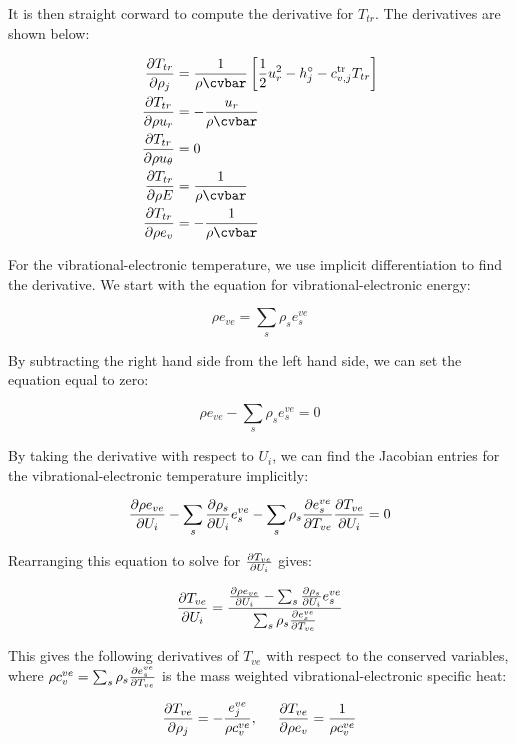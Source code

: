 \documentclass[10pt]{article}
\begin{document}
\begin{flushleft}
It is then straight corward to compute the derivative for $T_{tr}$. The derivatives are shown below:

\begin{align*}
    \pd{T_{tr}}{\rho_j} &= \frac{1}{\rho \cvbar} \bb{\frac{1}{2} u_r^2 - h_j^\circ - c_{v,j}^\text{tr} T_{tr}} \\
    \pd{T_{tr}}{\rho u_r} &= -\frac{u_r}{\rho \cvbar} \\
    \pd{T_{tr}}{\rho u_\theta} &= 0 \\
    \pd{T_{tr}}{\rho E} &= \frac{1}{\rho \cvbar} \\
    \pd{T_{tr}}{\rho e_v} &= -\frac{1}{\rho \cvbar}
\end{align*}

For the vibrational-electronic temperature, we use implicit differentiation to find the derivative. We start with the equation for vibrational-electronic energy:

\begin{equation*}
    \rho e_{ve} = \sum_s \rho_s e_s^{ve}
\end{equation*}

By subtracting the right hand side from the left hand side, we can set the equation equal to zero:

\begin{equation*}
    \rho e_{ve} - \sum_s \rho_s e_s^{ve} = 0
\end{equation*}

By taking the derivative with respect to $U_i$, we can find the Jacobian entries for the vibrational-electronic temperature implicitly:

\begin{equation}
    \frac{\partial \rho e_{ve}}{\partial U_i} - \sum_s \frac{\partial \rho_s}{\partial U_i} e_s^{ve} - \sum_s \rho_s \frac{\partial e_s^{ve}}{\partial T_{ve}} \frac{\partial T_{ve}}{\partial U_i} = 0
\end{equation}

Rearranging this equation to solve for $\frac{\partial T_{ve}}{\partial U_i}$ gives:

\begin{equation*}
    \frac{\partial T_{ve}}{\partial U_i} = \frac{\frac{\partial \rho e_{ve}}{\partial U_i} -\sum_s \frac{\partial \rho_s}{\partial U_i} e_s^{ve} }{\sum_s \rho_s \frac{\partial e_s^{ve}}{\partial T_{ve}}}
\end{equation*}

This gives the following derivatives of $T_{ve}$ with respect to the conserved variables, where $\rho c_v^{ve} = \sum_s \rho_s \frac{\partial e_s^{ve}}{\partial T_{ve}}$ is the mass weighted vibrational-electronic specific heat:

\begin{equation}
    \frac{\partial T_{ve}}{\partial \rho_j} = - \frac{e_j^{ve}}{\rho c_v^{ve}}, \hspace{5mm} \frac{\partial T_{ve}}{\partial \rho e_v} = \frac{1}{\rho c_v^{ve}}
\end{equation}


\end{flushleft}
\end{document}
